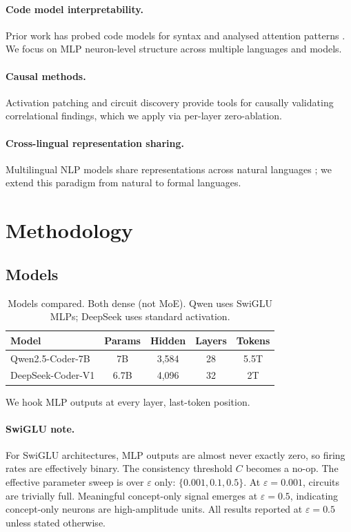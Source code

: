 \documentclass[11pt]{article}
\begin{document}
\paragraph{Code model interpretability.} Prior work has probed code models for syntax \citep{wan2022} and analysed attention patterns \citep{hernandez2024}. We focus on MLP neuron-level structure across multiple languages and models.

\paragraph{Causal methods.} Activation patching \citep{meng2022} and circuit discovery \citep{conmy2023, heimersheim2024} provide tools for causally validating correlational findings, which we apply via per-layer zero-ablation.

\paragraph{Cross-lingual representation sharing.} Multilingual NLP models share representations across natural languages \citep{pires2019, muller2021}; we extend this paradigm from natural to formal languages.

\section{Methodology}

\subsection{Models}

\begin{table}[h]
\centering
\small
\begin{tabular}{lcccc}
\toprule
Model & Params & Hidden & Layers & Tokens \\
\midrule
Qwen2.5-Coder-7B & 7B & 3{,}584 & 28 & 5.5T \\
DeepSeek-Coder-V1 & 6.7B & 4{,}096 & 32 & 2T \\
\bottomrule
\end{tabular}
\caption{Models compared. Both dense (not MoE). Qwen uses SwiGLU MLPs; DeepSeek uses standard activation.}
\label{tab:models}
\end{table}

We hook MLP outputs at every layer, last-token position.

\paragraph{SwiGLU note.} For SwiGLU architectures, MLP outputs are almost never exactly zero, so firing rates are effectively binary. The consistency threshold $C$ becomes a no-op. The effective parameter sweep is over $\varepsilon$ only: $\{0.001, 0.1, 0.5\}$. At $\varepsilon = 0.001$, circuits are trivially full. Meaningful concept-only signal emerges at $\varepsilon = 0.5$, indicating concept-only neurons are high-amplitude units. All results reported at $\varepsilon = 0.5$ unless stated otherwise.
\end{document}
